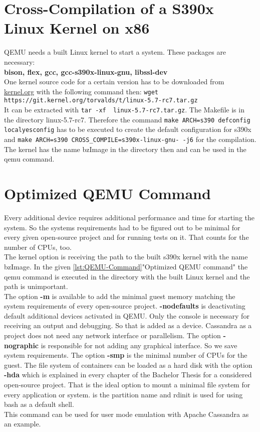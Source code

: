 \section{Cross-Compilation of a S390x Linux Kernel on x86}

QEMU needs a built Linux kernel to start a system. These packages are necessary: \\
\textbf{bison, flex, gcc, gcc-s390x-linux-gnu, libssl-dev} \\
One kernel source code for a certain version has to be downloaded from \url{kernel.org} with the following command then:  \lstinline!wget https://git.kernel.org/torvalds/t/linux-5.7-rc7.tar.gz!\\
It can be extracted with \lstinline!tar -xf  linux-5.7-rc7.tar.gz!. The Makefile is in the directory linux-5.7-rc7. Therefore the command \lstinline!make ARCH=s390 defconfig localyesconfig! has to be executed to create the default configuration for s390x and  \lstinline!make ARCH=s390 CROSS_COMPILE=s390x-linux-gnu- -j6! for the compilation. The kernel has the name bzImage in the directory  then and can be used in the qemu command.

\section{Optimized QEMU Command}\label{Optimized-Qemu-Command}

Every additional device requires additional performance and time for starting the system. 
So the systems requirements had to be figured out to be minimal for every given open-source project and for running tests on it. 
That counts for the number of CPUs, too. \\

The kernel option is receiving the path to the built s390x kernel with the name bzImage. In the given \ref{lst:QEMU-Command}"Optimized QEMU command" the qemu command is executed in the directory with the built Linux kernel and the path is unimportant. \\ 
The option \textbf{-m} is available to add the minimal guest memory matching the system requirements of every open-source project. 
\textbf{-nodefaults} is deactivating default additional devices activated in QEMU. 
Only the console is necessary for receiving an output and debugging. 
So that is added as a device. Cassandra as a project does not need any network interface or parallelism. The 
option \textbf{-nographic} is responsible for not adding any graphical interface. 
So we save system requirements. The option \textbf{-smp} is the minimal number of CPUs for the guest. 
The file system of containers can be loaded as a hard disk with the option \textbf{-hda} which is explained in every chapter of the Bachelor Thesis for a considered open-source project. 
That is the ideal option to mount a minimal file system for every application or system. 
 is the partition name and rdinit is used for using bash as a default shell. \\
This command can be used for user mode emulation with Apache Cassandra as an example.


